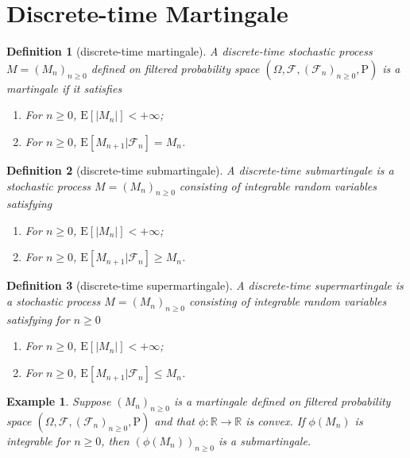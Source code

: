 \documentclass{report}
\newtheorem{definition}{Definition}[section]
\newtheorem{example}{Example}[section]
\theoremstyle{nonumberplain}
\begin{document}
\section{Discrete-time Martingale}
\begin{definition}[discrete-time martingale]
	A discrete-time stochastic process $M=(M_n)_{n\ge 0}$ defined on filtered probability space $(\Omega,\mathcal{F},(\mathcal{F}_{n})_{n\ge0},\mathrm{P})$ is a \emph{martingale} if it satisfies
	\begin{enumerate}
		\item For $n\ge0$, $\mathrm{E}[|M_n|]<+\infty$;
		\item For $n\ge0$, $\mathrm{E}[M_{n+1}|\mathcal{F}_n]=M_n$.
	\end{enumerate}
\end{definition}
\begin{definition}[discrete-time submartingale]
A discrete-time \emph{submartingale} is a stochastic process $M=(M_n)_{n\ge 0}$ consisting of integrable random variables satisfying 
\begin{enumerate}
	\item For $n\ge0$, $\mathrm{E}[|M_n|]<+\infty$;
	\item For $n\ge0$, $\mathrm{E}[M_{n+1}|\mathcal{F}_n]\ge M_n$.
\end{enumerate}

\end{definition}
\begin{definition}[discrete-time supermartingale]
	A discrete-time \emph{supermartingale} is a stochastic process $M=(M_n)_{n\ge 0}$ consisting of integrable random variables satisfying for $n\ge0$
	\begin{enumerate}
		\item For $n\ge0$, $\mathrm{E}[|M_n|]<+\infty$;
		\item For $n\ge0$, $\mathrm{E}[M_{n+1}|\mathcal{F}_n]\le M_n$.
	\end{enumerate}
\end{definition}

\begin{example}
	Suppose $(M_n)_{n\ge 0}$ is a martingale defined on filtered probability space $(\Omega,\mathcal{F},(\mathcal{F}_{n})_{n\ge0},\mathrm{P})$ and that $\phi:\mathbb{R}\to\mathbb{R}$ is convex. If $\phi(M_n)$ is integrable for $n\ge0$, then $\left(\phi(M_n)\right)_{n\ge 0}$ is a submartingale.
\end{example}
\end{document}

